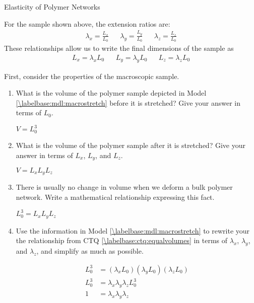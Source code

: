 \begin{activity}{Elasticity of Polymer Networks}
\begin{model}
	For the sample shown above, the extension ratios are:
	\begin{align*}
		\lambda_x = \frac{L_x}{L_0} && \lambda_y = \frac{L_y}{L_0} && \lambda_z = \frac{L_z}{L_0}
	\end{align*}
	These relationships allow us to write the final dimensions of the sample as
	\begin{align*}
		L_x = \lambda_x L_0 && L_y = \lambda_y L_0 && L_z = \lambda_z L_0
	\end{align*}
	
\end{model}


\begin{ctqs}

	\question First, consider the properties of the macroscopic sample.
	
		\begin{enumerate}
		
			\item What is the volume of the polymer sample depicted in Model \ref{\labelbase:mdl:macrostretch} before it is stretched?  Give your answer in terms of $L_0$.
	
		\begin{solution}[0.75in]
		
			$V = L_0^3$
		\end{solution}
	
			\item What is the volume of the polymer sample after it is stretched? Give your answer in terms of $L_x$, $L_y$, and $L_z$.
	
		\begin{solution}[0.75in]
		
			$V = L_x L_y L_z$
		\end{solution}
	
			\item There is usually no change in volume when we deform a bulk polymer network.  Write a mathematical relationship expressing this fact.
		\label{\labelbase:ctq:equalvolumes}
		\begin{solution}[0.75in]
			$L_0^3 = L_x L_y L_z$
		\end{solution}
			\item Use the information in Model \ref{\labelbase:mdl:macrostretch} to rewrite your the relationship from CTQ \ref{\labelbase:ctq:equalvolumes} in terms of $\lambda_x$, $\lambda_y$, and $\lambda_z$, and simplify as much as possible. \label{\labelbase:ctq:equalvolumes2}
	
		\begin{solution}[1.5in]
			\begin{align*}
				L_0^3 &= (\lambda_x L_0)(\lambda_y L_0)(\lambda_z L_0) \\
				L_0^3 & = \lambda_x \lambda_y \lambda_z L_0^3 \\
				1 &= \lambda_x \lambda_y \lambda_z
			\end{align*}
		\end{solution}
		

\end{enumerate}
\end{ctqs}
\end{activity}
